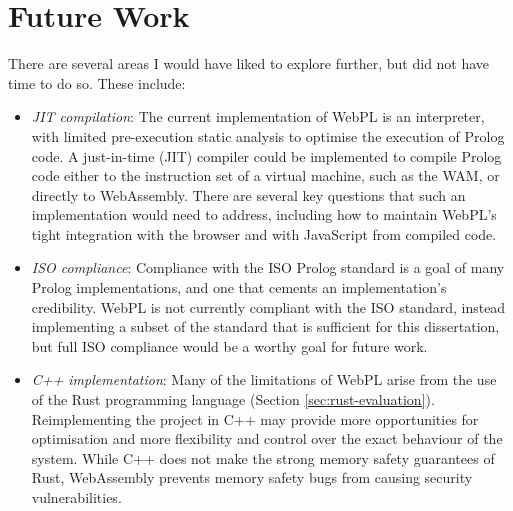 \section{Future Work}

There are several areas I would have liked to explore further, but did not have time to do so. These include:

\begin{itemize}
\item \emph{JIT compilation}: The current implementation of WebPL is an interpreter, with limited pre-execution static analysis to optimise the execution of Prolog code. A just-in-time (JIT) compiler could be implemented to compile Prolog code either to the instruction set of a virtual machine, such as the WAM, or directly to WebAssembly. There are several key questions that such an implementation would need to address, including how to maintain WebPL's tight integration with the browser and with JavaScript from compiled code.
\item \emph{ISO compliance}: Compliance with the ISO Prolog standard \cite{isoInformationtechnologyProgramming1995} is a goal of many Prolog implementations, and one that cements an implementation's credibility. WebPL is not currently compliant with the ISO standard, instead implementing a subset of the standard that is sufficient for this dissertation, but full ISO compliance would be a worthy goal for future work.
\item \emph{C++ implementation}: Many of the limitations of WebPL arise from the use of the Rust programming language (Section \ref{sec:rust-evaluation}). Reimplementing the project in C++ may provide more opportunities for optimisation and more flexibility and control over the exact behaviour of the system. While C++ does not make the strong memory safety guarantees of Rust, WebAssembly prevents memory safety bugs from causing security vulnerabilities.
\end{itemize}
